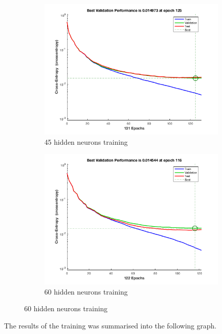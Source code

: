\begin{figure}
  \begin{subfigure}[t]{.5\textwidth}
    \centering
	\includegraphics[width=\linewidth]{../../pracs/week7/images/45_hidden_neurons}
	\caption{45 hidden neurons training}
  \end{subfigure}
  \hfill
  \begin{subfigure}[t]{.5\textwidth}
    \centering
	\includegraphics[width=\linewidth]{../../pracs/week7/images/60_hidden_neurons}
	\caption{60 hidden neurons training}
  \end{subfigure}
\end{figure}

The results of the training was summarised into the following graph.

